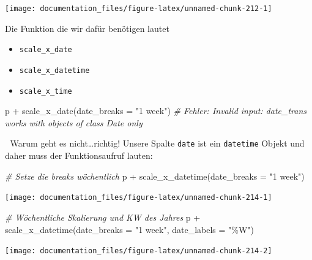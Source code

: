 \documentclass[
]{article}
\newenvironment{Shaded}{\begin{snugshade}}{\end{snugshade}}
\newcommand{\AttributeTok}[1]{\textcolor[rgb]{0.77,0.63,0.00}{#1}}
\newcommand{\CommentTok}[1]{\textcolor[rgb]{0.56,0.35,0.01}{\textit{#1}}}
\newcommand{\FunctionTok}[1]{\textcolor[rgb]{0.00,0.00,0.00}{#1}}
\newcommand{\NormalTok}[1]{#1}
\newcommand{\SpecialCharTok}[1]{\textcolor[rgb]{0.00,0.00,0.00}{#1}}
\newcommand{\StringTok}[1]{\textcolor[rgb]{0.31,0.60,0.02}{#1}}
\providecommand{\tightlist}{%
  \setlength{\itemsep}{0pt}\setlength{\parskip}{0pt}}
\begin{document}
\begin{center}\texttt{[image: documentation\_files/figure-latex/unnamed-chunk-212-1]} \end{center}

Die Funktion die wir dafür benötigen lautet

\begin{itemize}
\tightlist
\item
  \texttt{scale\_x\_date}
\item
  \texttt{scale\_x\_datetime}
\item
  \texttt{scale\_x\_time}
\end{itemize}

\begin{Shaded}
\begin{Highlighting}[]
\NormalTok{p }\SpecialCharTok{+} \FunctionTok{scale\_x\_date}\NormalTok{(}\AttributeTok{date\_breaks =} \StringTok{"1 week"}\NormalTok{)}
\CommentTok{\# Fehler: Invalid input: date\_trans works with objects of class Date only}
\end{Highlighting}
\end{Shaded}

🤯 Warum geht es nicht\ldots richtig! Unsere Spalte \texttt{date} ist ein \texttt{datetime} Objekt und daher muss der Funktionsaufruf lauten:

\begin{Shaded}
\begin{Highlighting}[]
\CommentTok{\# Setze die breaks wöchentlich}
\NormalTok{p }\SpecialCharTok{+} \FunctionTok{scale\_x\_datetime}\NormalTok{(}\AttributeTok{date\_breaks =} \StringTok{"1 week"}\NormalTok{)}
\end{Highlighting}
\end{Shaded}

\begin{center}\texttt{[image: documentation\_files/figure-latex/unnamed-chunk-214-1]} \end{center}

\begin{Shaded}
\begin{Highlighting}[]
\CommentTok{\# Wöchentliche Skalierung und KW des Jahres}
\NormalTok{p }\SpecialCharTok{+} \FunctionTok{scale\_x\_datetime}\NormalTok{(}\AttributeTok{date\_breaks =} \StringTok{"1 week"}\NormalTok{, }\AttributeTok{date\_labels =} \StringTok{"\%W"}\NormalTok{)}
\end{Highlighting}
\end{Shaded}

\begin{center}\texttt{[image: documentation\_files/figure-latex/unnamed-chunk-214-2]} \end{center}
\end{document}
